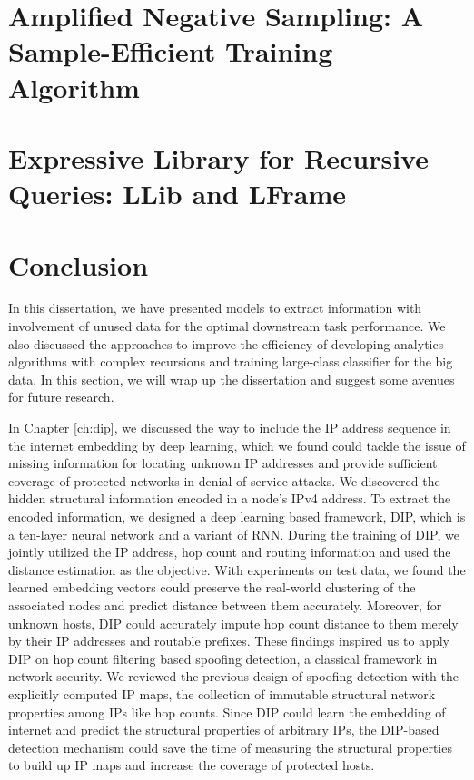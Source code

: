 \documentclass [PhD] {uclathes}
\begin{document}


\chapter{Amplified Negative Sampling: A Sample-Efficient Training Algorithm }
\label{ch:nec}


\chapter{Expressive Library for Recursive Queries: LLib and LFrame}
\label{ch:lib}




\chapter{Conclusion}
\label{ch:con}

In this dissertation, we have presented models to extract information with involvement of unused data for the optimal downstream task performance. We also discussed the approaches to improve the efficiency of  developing analytics algorithms with complex recursions and training large-class classifier for the big data. In this section, we will wrap up the dissertation and suggest some avenues for future research.

In Chapter \ref{ch:dip}, we discussed the way to include the IP address sequence in the internet embedding by deep learning, which we found could tackle the issue of missing information for locating unknown IP addresses and provide sufficient coverage of  protected networks in denial-of-service attacks. We discovered the hidden structural information encoded in a node's IPv4 address. To extract the encoded information, we designed a deep learning based framework, DIP, which is a ten-layer neural network and a variant of RNN. During the training of DIP, we jointly utilized the IP address, hop count and routing information and used the distance estimation as the objective. With experiments on  test data, we found the learned embedding vectors  could preserve the real-world clustering of the associated nodes and predict distance between them accurately. Moreover, for unknown hosts, DIP could accurately impute hop count distance to them merely by their IP addresses and routable prefixes. These findings inspired us to apply DIP on hop count filtering based spoofing detection, a classical framework in network security. We reviewed the previous design of spoofing detection with the explicitly computed IP maps, the collection of  immutable structural network properties  among IPs like hop counts.  Since DIP could learn the embedding of internet and predict the structural properties of arbitrary IPs, the DIP-based detection mechanism could save the time of measuring the structural properties to build up  IP maps and increase the coverage of protected hosts. 
\end{document}
